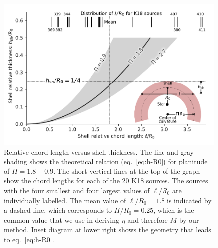 \begin{figure}
  \centering
  \includegraphics[width=\linewidth]{figs/H_versus_ell_annotated}
  \caption{Relative chord length versus shell thickness.  The line and
    gray shading shows the theoretical relation (eq.~\eqref{eq:h-R0})
    for planitude of \(\Pi = 1.8 \pm 0.9\).  The short vertical lines
    at the top of the graph show the chord lengths for each of the 20
    K18 sources.  The sources with the four smallest and four largest
    values of \(\ell/R_0\) are individually labelled. The mean value
    of \(\ell / R_0 = 1.8\) is indicated by a dashed line, which
    corresponds to \(H/R_0 = 0.25\), which is the common value that we
    use in deriving \(\eta\) and therefore \(\dot{M}\) by our method.
    Inset diagram at lower right shows the geometry that leads to
    eq.~\eqref{eq:h-R0}.  }
  \label{fig:H-versus-ell}
\end{figure}


